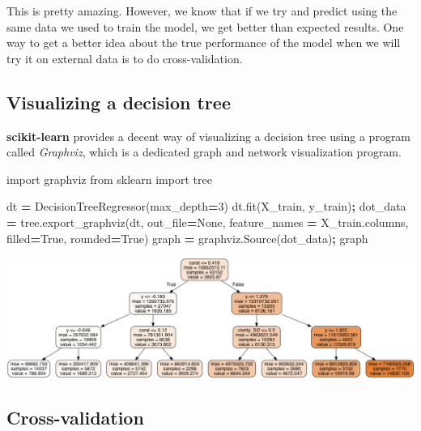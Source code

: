 \documentclass[
  letterpaper,
]{scrbook}
\newenvironment{Shaded}{\begin{snugshade}}{\end{snugshade}}
\newcommand{\DecValTok}[1]{\textcolor[rgb]{0.00,0.00,0.81}{#1}}
\newcommand{\ImportTok}[1]{#1}
\newcommand{\NormalTok}[1]{#1}
\newcommand{\OperatorTok}[1]{\textcolor[rgb]{0.81,0.36,0.00}{\textbf{#1}}}
\newcommand{\VariableTok}[1]{\textcolor[rgb]{0.00,0.00,0.00}{#1}}
\begin{document}
This is pretty amazing. However, we know that if we try and predict using the same data we used to train
the model, we get better than expected results. One way to get a better idea about the true performance of the
model when we will try it on external data is to do cross-validation.

\hypertarget{visualizing-a-decision-tree}{%
\subsection{Visualizing a decision tree}\label{visualizing-a-decision-tree}}

\textbf{scikit-learn} provides a decent way of visualizing a decision tree using a program called \emph{Graphviz}, which is a dedicated graph and network visualization program.

\begin{Shaded}
\begin{Highlighting}[]
\ImportTok{import}\NormalTok{ graphviz}
\ImportTok{from}\NormalTok{ sklearn }\ImportTok{import}\NormalTok{ tree}

\NormalTok{dt }\OperatorTok{=}\NormalTok{ DecisionTreeRegressor(max_depth}\OperatorTok{=}\DecValTok{3}\NormalTok{)}
\NormalTok{dt.fit(X_train, y_train)}\OperatorTok{;}
\NormalTok{dot_data }\OperatorTok{=}\NormalTok{ tree.export_graphviz(dt, out_file}\OperatorTok{=}\VariableTok{None}\NormalTok{, }
\NormalTok{                                feature_names }\OperatorTok{=}\NormalTok{ X_train.columns,}
\NormalTok{                                filled}\OperatorTok{=}\VariableTok{True}\NormalTok{, rounded}\OperatorTok{=}\VariableTok{True}\NormalTok{)}
\NormalTok{graph }\OperatorTok{=}\NormalTok{ graphviz.Source(dot_data)}\OperatorTok{;}
\NormalTok{graph}
\end{Highlighting}
\end{Shaded}

\begin{center}\includegraphics[width=0.9\linewidth]{graphs/image} \end{center}

\hypertarget{cross-validation}{%
\subsection{Cross-validation}\label{cross-validation}}
\end{document}
